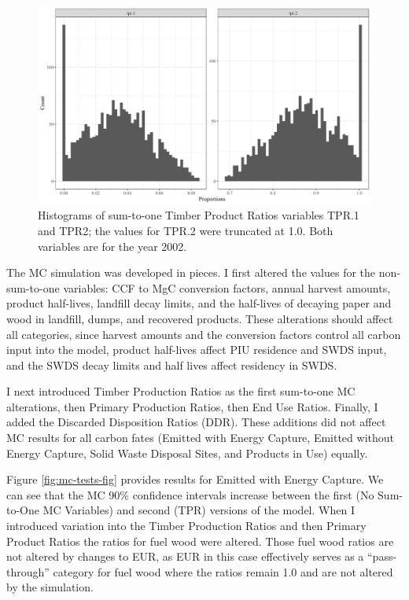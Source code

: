 \documentclass[
]{book}
\begin{document}
\begin{figure}
\includegraphics[width=1\linewidth]{images/triang3} \caption{Histograms of sum-to-one Timber Product Ratios variables TPR.1 and TPR2; the values for TPR.2 were truncated at 1.0.  Both variables are for the year 2002.}\label{fig:mc-tri3-fig}
\end{figure}

The MC simulation was developed in pieces. I first altered the values for the non-sum-to-one variables: CCF to MgC conversion factors, annual harvest amounts, product half-lives, landfill decay limits, and the half-lives of decaying paper and wood in landfill, dumps, and recovered products. These alterations should affect all categories, since harvest amounts and the conversion factors control all carbon input into the model, product half-lives affect PIU residence and SWDS input, and the SWDS decay limits and half lives affect residency in SWDS.

I next introduced Timber Production Ratios as the first sum-to-one MC alterations, then Primary Production Ratios, then End Use Ratios. Finally, I added the Discarded Disposition Ratios (DDR). These additions did not affect MC results for all carbon fates (Emitted with Energy Capture, Emitted without Energy Capture, Solid Waste Disposal Sites, and Products in Use) equally.

Figure \ref{fig:mc-tests-fig} provides results for Emitted with Energy Capture. We can see that the MC 90\% confidence intervals increase between the first (No Sum-to-One MC Variables) and second (TPR) versions of the model. When I introduced variation into the Timber Production Ratios and then Primary Product Ratios the ratios for fuel wood were altered. Those fuel wood ratios are not altered by changes to EUR, as EUR in this case effectively serves as a ``pass-through'' category for fuel wood where the ratios remain 1.0 and are not altered by the simulation.
\end{document}

